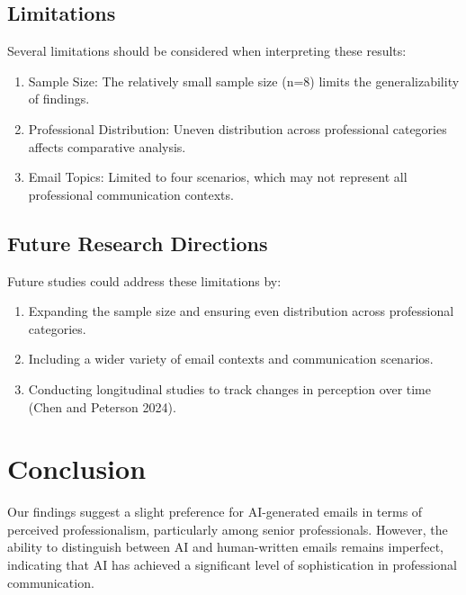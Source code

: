 \documentclass[
]{article}
\providecommand{\tightlist}{%
  \setlength{\itemsep}{0pt}\setlength{\parskip}{0pt}}\usepackage{longtable,booktabs,array}
\begin{document}
\subsection{Limitations}\label{limitations}

Several limitations should be considered when interpreting these
results:

\begin{enumerate}
\def\labelenumi{\arabic{enumi}.}
\tightlist
\item
  Sample Size: The relatively small sample size (n=8) limits the
  generalizability of findings.
\item
  Professional Distribution: Uneven distribution across professional
  categories affects comparative analysis.
\item
  Email Topics: Limited to four scenarios, which may not represent all
  professional communication contexts.
\end{enumerate}

\subsection{Future Research
Directions}\label{future-research-directions}

Future studies could address these limitations by:

\begin{enumerate}
\def\labelenumi{\arabic{enumi}.}
\tightlist
\item
  Expanding the sample size and ensuring even distribution across
  professional categories.
\item
  Including a wider variety of email contexts and communication
  scenarios.
\item
  Conducting longitudinal studies to track changes in perception over
  time (Chen and Peterson 2024).
\end{enumerate}

\section{Conclusion}\label{conclusion}

Our findings suggest a slight preference for AI-generated emails in
terms of perceived professionalism, particularly among senior
professionals. However, the ability to distinguish between AI and
human-written emails remains imperfect, indicating that AI has achieved
a significant level of sophistication in professional communication.
\end{document}
